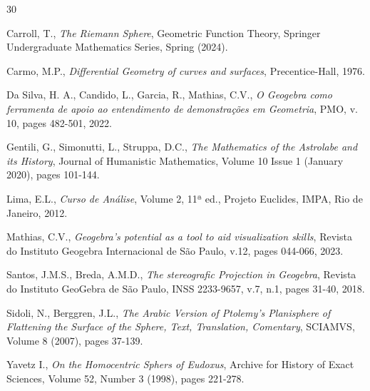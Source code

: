 \documentclass{amsart}
\theoremstyle{plain}
\numberwithin{equation}{section}
\begin{document}
	
	
	\begin{thebibliography}{30}
		
	Carroll, T., \textit{The Riemann Sphere}, Geometric Function Theory, Springer Undergraduate Mathematics Series, Spring (2024).
	
	Carmo, M.P., \textit{Differential Geometry of curves and surfaces}, Precentice-Hall, 1976.
	
	 Da Silva, H. A., Candido, L., Garcia, R., Mathias, C.V., \textit{O Geogebra como ferramenta de apoio ao entendimento de demonstrações em Geometria}, PMO, v. 10, pages 482-501, 2022.
	
	Gentili, G., Simonutti, L., Struppa, D.C., \textit{The Mathematics of the Astrolabe and its History}, Journal of Humanistic Mathematics, Volume 10 Issue 1 (January 2020), pages 101-144.
	
	Lima, E.L., \textit{Curso de Análise}, Volume 2, 11ª ed., Projeto Euclides, IMPA, Rio de Janeiro, 2012.
	
	 Mathias, C.V., \textit{Geogebra's potential as a tool to aid visualization skills}, Revista do Instituto Geogebra Internacional de São Paulo, v.12, pages 044-066, 2023.
	
	 Santos, J.M.S., Breda, A.M.D., \textit{The stereografic Projection in Geogebra}, Revista do Instituto GeoGebra de São Paulo, INSS 2233-9657, v.7, n.1, pages 31-40, 2018.
	
	Sidoli, N., Berggren, J.L., \textit{The Arabic Version of Ptolemy's Planisphere of Flattening the Surface of the Sphere, Text, Translation, Comentary}, SCIAMVS, Volume 8 (2007), pages 37-139.
	
	 Yavetz I., \textit{On the Homocentric Sphers of Eudoxus}, Archive for History of Exact Sciences, Volume 52, Number 3 (1998), pages 221-278.
	
		
	\end{thebibliography}
\end{document}
